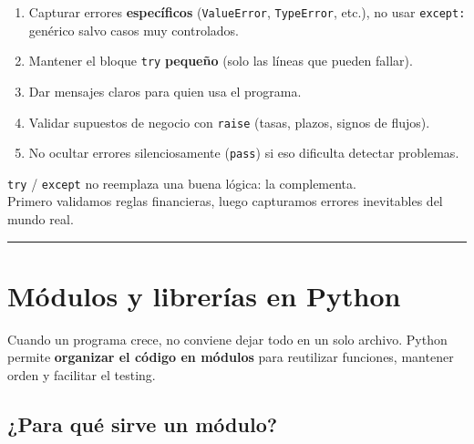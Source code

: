 \documentclass[
  spanish,
  letterpaper,
  DIV=11,
  numbers=noendperiod]{scrreprt}
\providecommand{\tightlist}{%
  \setlength{\itemsep}{0pt}\setlength{\parskip}{0pt}}
\begin{document}
\begin{enumerate}
\def\labelenumi{\arabic{enumi}.}
\tightlist
\item
  Capturar errores \textbf{específicos} (\texttt{ValueError},
  \texttt{TypeError}, etc.), no usar \texttt{except:} genérico salvo
  casos muy controlados.
\item
  Mantener el bloque \texttt{try} \textbf{pequeño} (solo las líneas que
  pueden fallar).
\item
  Dar mensajes claros para quien usa el programa.
\item
  Validar supuestos de negocio con \texttt{raise} (tasas, plazos, signos
  de flujos).
\item
  No ocultar errores silenciosamente (\texttt{pass}) si eso dificulta
  detectar problemas.
\end{enumerate}

\begin{tcolorbox}[enhanced jigsaw, bottomrule=.15mm, colback=white, opacitybacktitle=0.6, arc=.35mm, toprule=.15mm, opacityback=0, breakable, titlerule=0mm, left=2mm, coltitle=black, colbacktitle=quarto-callout-important-color!10!white, colframe=quarto-callout-important-color-frame, leftrule=.75mm, toptitle=1mm, bottomtitle=1mm, title=\textcolor{quarto-callout-important-color}{\faExclamation}\hspace{0.5em}{Idea clave}, rightrule=.15mm]

\texttt{try} / \texttt{except} no reemplaza una buena lógica: la
complementa.\\
Primero validamos reglas financieras, luego capturamos errores
inevitables del mundo real.

\end{tcolorbox}

\begin{center}\rule{0.5\linewidth}{0.5pt}\end{center}

\section{Módulos y librerías en
Python}\label{muxf3dulos-y-libreruxedas-en-python}

Cuando un programa crece, no conviene dejar todo en un solo archivo.
Python permite \textbf{organizar el código en módulos} para reutilizar
funciones, mantener orden y facilitar el testing.

\subsection{¿Para qué sirve un
módulo?}\label{para-quuxe9-sirve-un-muxf3dulo}
\end{document}
